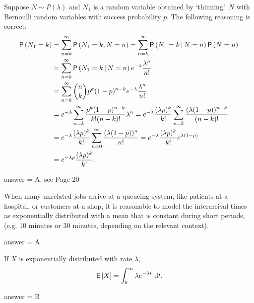 \begin{exercise}[201802]
Suppose $N\sim P(\lambda)$ and $N_1$ is a random variable obtained by `thinning'~$N$ with Bernoulli random variables with success probability $p$. The following reasoning is correct:
\begin{equation*}
  \begin{split}
    \P{N_1 = k}
&= \sum_{n=k}^\infty \P{N_1 =k, N = n} 
= \sum_{n=k}^\infty \P{N_1 =k\given N = n}\P{N=n} \\
&= \sum_{n=k}^\infty \P{N_1 =k\given N = n}e^{-\lambda} \frac{\lambda^n}{n!}\\
&= \sum_{n=k}^\infty {n \choose k} p^k (1-p)^{n-k} e^{-\lambda} \frac{\lambda^n}{n!} \\
&= e^{-\lambda}\sum_{n=k}^\infty  \frac{p^k (1-p)^{n-k}}{k! (n-k)!} \lambda^n
= e^{-\lambda} \frac{(\lambda p)^k}{k!} \sum_{n=k}^\infty  \frac{(\lambda (1-p))^{n-k}}{(n-k)!}\\
&= e^{-\lambda} \frac{(\lambda p)^k}{k!} \sum_{n=0}^\infty  \frac{(\lambda (1-p))^{n}}{n!}
= e^{-\lambda} \frac{(\lambda p)^k}{k!} e^{\lambda(1-p)} \\
&= e^{-\lambda p} \frac{(\lambda p)^k}{k!}.
  \end{split}
\end{equation*}
\begin{solution}
answer = A, see Page 20
\end{solution}
\end{exercise}

\begin{exercise}[201802]
When many unrelated jobs arrive at a queueing system, like patients at a hospital, or customers at a shop, it is reasonable to model the interarrival times as exponentially distributed with a mean that is constant during short periods, (e.g. 10 minutes or 30 minutes, depending on the relevant context). 
\begin{solution}
answer = A
\end{solution}
\end{exercise}

\begin{exercise}[201802]
If $X$ is exponentially distributed with rate $\lambda$,
 \begin{equation*}
    \,\mathsf{E}\left[X\right] = \int_0^\infty \lambda e^{-\lambda t}\, \,\text{d}t.
  \end{equation*}
\begin{solution}
answer = B
\end{solution}
\end{exercise}

